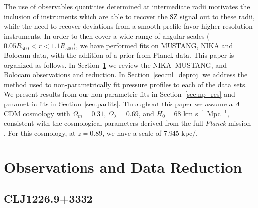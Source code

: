 \documentclass[twocolumn,traditabstract]{aa}
\begin{document}
The use of observables quantities determined at intermediate radii motivates the inclusion of instruments which are able
to recover the SZ signal out to these radii, while the need to recover deviations from a smooth profile favor higher
resolution instruments. In order to then cover a wide range of angular scales ($0.05 R_{500} < r < 1.1 R_{500}$), we have
performed fits on MUSTANG, NIKA and Bolocam data, with the addition of a prior from Planck data.
This paper is organized as follows. In Section~\ref{sec:obs} we review the NIKA, MUSTANG, and Bolocam observations and reduction. 
In Section~\ref{sec:ml_deproj} we address the method used to non-parametrically fit pressure profiles to each of the data sets.
We present results from our non-parametric fits in Section~\ref{sec:np_res} and parametric fits in Section~\ref{sec:parfits}. 
Throughout this paper we assume a $\Lambda$CDM cosmology with $\Omega_m = 0.31$, $\Omega_{\lambda} = 0.69$, and $H_0 = 68$ 
km s$^{-1}$ Mpc$^{-1}$, consistent with the cosmological parameters derived from the full \emph{Planck} mission
\citep{planck2016_cp}. For this cosmology, at $z=0.89$, we have a scale of 7.945 kpc/\asec.

\section{Observations and Data Reduction}
\label{sec:obs}

\subsection{CLJ1226.9+3332}
\label{sec:sample_clj1227}
\end{document}
